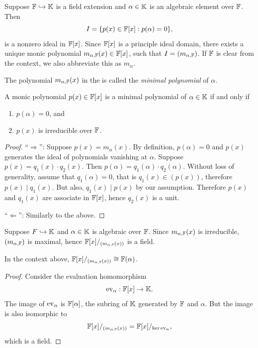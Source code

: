 Suppose $\mathbb{F} \hookrightarrow \mathbb{K}$ is a field extension and $\alpha \in \mathbb{K}$ is an algebraic element over $\mathbb{F}$. Then
\[
    I = \{ p(x) \in \mathbb{F}[x] : p(\alpha) = 0 \},
\]
is a nonzero ideal in $\mathbb{F}[x]$. Since $\mathbb{F}[x]$ is a principle ideal domain, there exists a unique monic polynomial $m_{\alpha,\mathbb{F}}(x) \in \mathbb{F}[x]$, such that $I = (m_{\alpha,\mathbb{F}})$. If $\mathbb{F}$ is clear from the context, we also abbreviate this as $m_\alpha$.

\begin{definition}
    The polynomial $m_{\alpha,\mathbb{F}}(x)$ in the is called the \emph{minimal polynomial} of $\alpha$.
\end{definition}

\begin{lemma}
    A monic polynomial $p(x) \in \mathbb{F}[x]$ is a minimal polynomial of $\alpha \in \mathbb{K}$ if and only if
    \begin{enumerate}
        \item $p(\alpha) = 0$, and
        \item $p(x)$ is irreducible over $\mathbb{F}$.
    \end{enumerate}
\end{lemma}

\begin{proof}
    ``$\Longrightarrow$'': Suppose $p(x) = m_{\alpha}(x)$. By definition, $p(\alpha) = 0$ and $p(x)$ generates the ideal of polynomials vanishing at $\alpha$. Suppose $p(x) = q_1(x) \cdot q_2(x)$. Then $p(\alpha) = q_1(\alpha) \cdot q_2(\alpha)$. Without loss of generality, assume that $q_1(\alpha) = 0$, that is $q_1(x) \in (p(x))$, therefore $p(x) \mid q_1(x)$. But also, $q_1(x) \mid p(x)$ by our assumption. Therefore $p(x)$ and $q_1(x)$ are associate in $\mathbb{F}[x]$, hence $q_2(x)$ is a unit.

    ``$\Longleftarrow$'': Similarly to the above.
\end{proof}

Suppose $F \hookrightarrow \mathbb{K}$ and $\alpha \in \mathbb{K}$ is algebraic over $\mathbb{F}$. Since $m_{\alpha,\mathbb{F}}(x)$ is irreducible, $(m_{\alpha,\mathbb{F}})$ is maximal, hence $\mathbb{F}[x]/_{(m_{\alpha,\mathbb{F}}(x))}$ is a field.

\begin{proposition}
    In the context above, $\mathbb{F}[x]/_{(m_{\alpha,\mathbb{F}}(x))} \cong \mathbb{F}(\alpha)$.
\end{proposition}

\begin{proof}
    Consider the evaluation homomorphism
    \[
        \operatorname{ev}_\alpha : \mathbb{F}[x] \to \mathbb{K}.
    \]
    The image of $\operatorname{ev}_\alpha$ is $\mathbb{F}[\alpha]$, the subring of $\mathbb{K}$ generated by $\mathbb{F}$ and $\alpha$. But the image is also isomorphic to
    \[
        \mathbb{F}[x]/_{(m_{\alpha,\mathbb{F}}(x))}
        =
        \mathbb{F}[x]/_{\ker \operatorname{ev}_{\alpha}},
    \]
    which is a field.
\end{proof}

